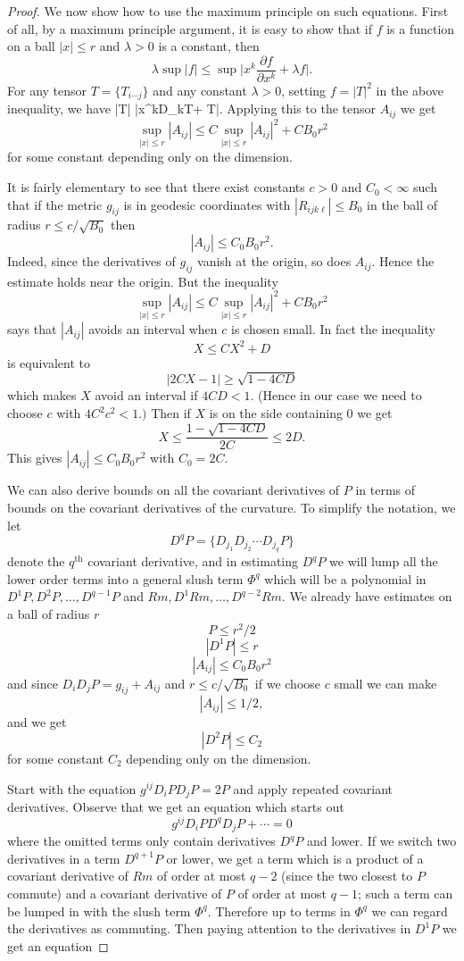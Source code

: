 \begin{proof}
We now show how to use the maximum principle on such equations.
First of all, by a maximum principle argument, it is easy to show
that if $f$ is a function on a ball $|x| \leq r$ and $\lambda>0$
is a constant, then
$$
\lambda \operatorname{sup}|f| \leq \operatorname{sup} \Big| x^k
\frac{\partial f}{\partial x^k} + \lambda f \Big|.
$$
For any tensor $T=\{T_{i \cdots j}\}$ and any constant $\lambda
>0$, setting $f=|T|^2$ in the above inequality, we have \be
\lambda \sup|T| \leq \sup|x^kD_kT+
\lambda T|. %
\ee Applying this to the tensor $A_{ij}$ we get
\[
\sup_{|x| \leq r} |A_{ij}| \leq C \sup_{|x| \leq r}
|A_{ij}|^2+CB_0r^2
\]
for some constant depending only on the dimension.

It is fairly elementary to see that there exist constants $c>0$
and $C_0 < \infty$ such that if the metric $g_{ij}$ is in geodesic
coordinates with $|R_{ijk \ell}| \leq B_0$ in the ball of radius
$r \leq c /\sqrt{B_0}$ then
$$
|A_{ij}| \leq C_0 B_0r^2.
$$
Indeed, since the derivatives of $g_{ij}$ vanish at the origin, so
does $A_{ij}$. Hence the estimate holds near the origin. But the
inequality
$$
\sup_{|x| \leq r} |A_{ij}| \leq C \sup_{|x| \leq r}
|A_{ij}|^2+CB_0r^2
$$
says that $|A_{ij}|$ avoids an interval when $c$ is chosen small.
In fact the inequality
$$
X \leq CX^2+D
$$
is equivalent to
$$
|2CX-1| \geq \sqrt{1-4CD}
$$
which makes $X$ avoid an interval if $4CD<1$. (Hence in our case
we need to choose $c$ with $4C^2c^2<1.)$ Then if $X$ is on the
side containing $0$ we get
$$
X \leq \frac{1- \sqrt{1 - 4CD}}{2C} \leq 2D.
$$
This gives $|A_{ij}| \leq C_0B_0r^2$ with $C_0=2C$.

\smallskip
We can also derive bounds on all the covariant derivatives of $P$
in terms of bounds on the covariant derivatives of the curvature.
To simplify the notation, we let
$$
D^qP= \{D_{j_1}D_{j_2} \cdots D_{j_q}P \}
$$
denote the $q^{\operatorname{th}}$ covariant derivative, and in
estimating $D^qP$ we will lump all the lower order terms into a
general slush term $\Phi^q$ which will be a polynomial in
$D^1P,D^2P, \ldots, D^{q-1}P$ and $Rm, D^1Rm, \ldots, D^{q-2}Rm$.
We already have estimates on a ball of radius $r$
$$
P \leq r^2/2
$$
$$
|D^1P|\leq r
$$
$$
|A_{ij}| \leq C_0 B_0r^2
$$
and since $D_iD_jP=g_{ij}+A_{ij}$ and $r \leq c /\sqrt{B_0}$ if we
choose $c$ small we can make
$$
|A_{ij}|\leq 1/2,
$$
and we get
$$
|D^2P| \leq C_2
$$
for some constant $C_2$ depending only on the dimension.

\smallskip
Start with the equation $g^{ij}D_iPD_jP=2P$ and apply repeated
covariant derivatives. Observe that we get an equation which
starts out
$$
g^{ij}D_iPD^qD_jP+ \cdots =0
$$
where the omitted terms only contain derivatives $D^qP$ and lower.
If we switch two derivatives in a term $D^{q+1}P$ or lower, we get
a term which is a product of a covariant derivative of $Rm$ of
order at most $q-2$ (since the two closest to $P$ commute) and a
covariant derivative of $P$ of order at most $q-1$; such a term
can be lumped in with the slush term $\Phi^q$. Therefore up to
terms in $\Phi^q$ we can regard the derivatives as commuting. Then
paying attention to the derivatives in $D^1P$ we get an equation


\end{proof}
